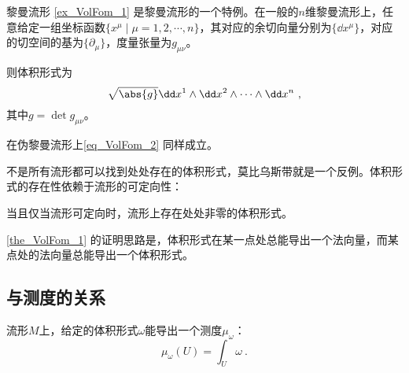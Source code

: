\begin{example}{黎曼流形}
\autoref{ex_VolFom_1} 是黎曼流形的一个特例。在一般的$n$维黎曼流形上，任意给定一组坐标函数$\{x^\mu\mid \mu=1, 2, \cdots, n\}$，其对应的余切向量分别为$\{\dd x^\mu\}$，对应的切空间的基为$\{\partial_\mu\}$，度量张量为$g_{\mu\nu}$。

则体积形式为
\begin{equation}\label{eq_VolFom_2}
\sqrt{\abs{g}}\dd x^1\wedge \dd x^2\wedge \cdots \wedge \dd x^n~,
\end{equation}
其中$g=\det g_{\mu\nu}$。

在伪黎曼流形上\autoref{eq_VolFom_2} 同样成立。
\end{example}



不是所有流形都可以找到处处存在的体积形式，莫比乌斯带就是一个反例。体积形式的存在性依赖于流形的可定向性：


\begin{theorem}{}\label{the_VolFom_1}
当且仅当流形可定向时，流形上存在处处非零的体积形式。
\end{theorem}

\autoref{the_VolFom_1} 的证明思路是，体积形式在某一点处总能导出一个法向量，而某点处的法向量总能导出一个体积形式。



\subsection{与测度的关系}


流形$M$上，给定的体积形式$\omega$能导出一个测度$\mu_{\omega}$：
\begin{equation}
\mu_\omega(U) = \int_U \omega~.
\end{equation}
















